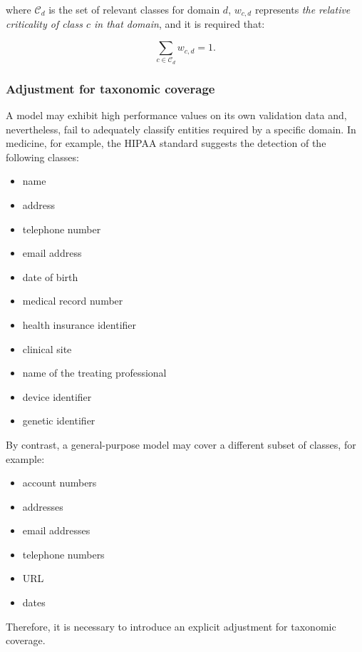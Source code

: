\documentclass[11pt,a4paper]{article}
\begin{document}
where $\mathcal{C}_d$ is the set of relevant classes for domain $d$, $w_{c,d}$ represents \textit{the relative criticality of class $c$ in that domain}, and it is required that:

\begin{equation}
    \sum_{c\in\mathcal{C}_d} w_{c,d}=1.
\end{equation}

\subsubsection{Adjustment for taxonomic coverage}

A model may exhibit high performance values on its own validation data and, nevertheless, fail to adequately classify entities required by a specific domain. In medicine, for example, the HIPAA standard suggests the detection of the following classes:

\begin{itemize}
    \item name
    \item address
    \item telephone number
    \item email address
    \item date of birth
    \item medical record number
    \item health insurance identifier
    \item clinical site
    \item name of the treating professional
    \item device identifier
    \item genetic identifier
\end{itemize}

By contrast, a general-purpose model may cover a different subset of classes, for example:

\begin{itemize}
    \item account numbers
    \item addresses
    \item email addresses
    \item telephone numbers
    \item URL
    \item dates
\end{itemize}

Therefore, it is necessary to introduce an explicit adjustment for taxonomic coverage.
\end{document}
